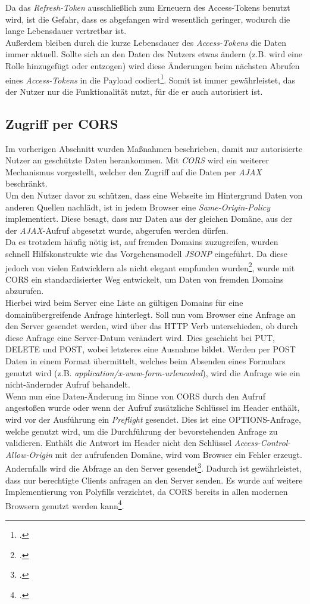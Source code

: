 Da das \textit{Refresh-Token} ausschließlich zum Erneuern des Access-Tokens benutzt wird, ist die Gefahr, dass es abgefangen wird wesentlich geringer, wodurch die lange Lebensdauer vertretbar ist. \\
Außerdem bleiben durch die kurze Lebensdauer des \textit{Access-Tokens} die Daten immer aktuell. Sollte sich an den Daten des Nutzers etwas ändern (z.B. wird eine Rolle hinzugefügt oder entzogen) wird diese Änderungen beim nächsten Abrufen eines \textit{Access-Tokens} in die Payload codiert\footcite{online:Implemented_OAuth_RefreshToken}. Somit ist immer gewährleistet, das der Nutzer nur die Funktionalität nutzt, für die er auch autorisiert ist. 
\subsection{Zugriff per CORS}
\label{ssec:cors}
Im vorherigen Abschnitt wurden Maßnahmen beschrieben, damit nur autorisierte Nutzer an geschützte Daten herankommen. Mit \textit{\ac{CORS}} wird ein weiterer Mechanismus vorgestellt, welcher den Zugriff auf die Daten per \textit{\ac{AJAX}} beschränkt. \\
Um den Nutzer davor zu schützen, dass eine Webseite im Hintergrund Daten von anderen Quellen nachlädt, ist in jedem Browser eine \textit{Same-Origin-Policy} implementiert. Diese besagt, dass nur Daten aus der gleichen Domäne, aus der der \textit{\ac{AJAX}}-Aufruf abgesetzt wurde, abgerufen werden dürfen. \\
Da es trotzdem häufig nötig ist, auf fremden Domains zuzugreifen, wurden schnell Hilfskonstrukte wie das Vorgehensmodell \textit{\gls{JSONP}} eingeführt. Da diese jedoch von vielen Entwicklern als nicht elegant empfunden wurden\footcite[S. 102]{book:AngularJs:Steyer2015}, wurde mit \ac{CORS} ein standardisierter Weg entwickelt, um Daten von fremden Domains abzurufen. \\
Hierbei wird beim Server eine Liste an gültigen Domains für eine domainübergreifende Anfrage hinterlegt. Soll nun vom Browser eine Anfrage an den Server gesendet werden, wird über das \ac{HTTP} Verb unterschieden, ob durch diese Anfrage eine Server-Datum verändert wird. Dies geschieht bei PUT, DELETE und POST, wobei letzteres eine Ausnahme bildet. Werden per POST Daten in einem Format übermittelt, welches beim Absenden eines Formulars genutzt wird (z.B. \textit{application/x-www-form-urlencoded}), wird die Anfrage wie ein nicht-ändernder Aufruf behandelt. \\
Wenn nun eine Daten-Änderung im Sinne von \ac{CORS} durch den Aufruf angestoßen wurde oder wenn der Aufruf zusätzliche Schlüssel im Header enthält, wird vor der Ausführung ein \textit{Preflight} gesendet. Dies ist eine OPTIONS-Anfrage, welche genutzt wird, um die Durchführung der bevorstehenden Anfrage zu validieren.
Enthält die Antwort im Header nicht den Schlüssel \textit{Access-Control-Allow-Origin} mit der aufrufenden Domäne, wird vom Browser ein Fehler erzeugt. Andernfalls wird die Abfrage an den Server gesendet\footcite[S. 102]{book:AngularJs:Steyer2015}. Dadurch ist gewährleistet, dass nur berechtigte Clients anfragen an den Server senden. Es wurde auf weitere Implementierung von \gls{Polyfills} verzichtet, da \ac{CORS} bereits in allen modernen Browsern genutzt werden kann\footcite{online:can-i-use:cors}.
